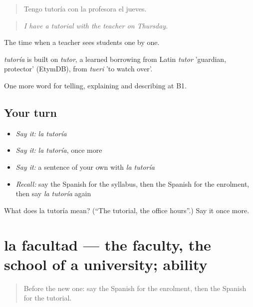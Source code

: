\begin{quote}
Tengo tutoría con la profesora el jueves.
\end{quote}

\begin{quote}
\emph{I have a tutorial with the teacher on Thursday.}
\end{quote}

The time when a teacher sees students one by one.

\begin{cousinweb}
\emph{tutoría} is built on \emph{tutor}, a learned borrowing from Latin \emph{tutor} 'guardian, protector' (EtymDB), from \emph{tueri} 'to watch over'.
\end{cousinweb}

\begin{grammarlens}[title={What you've built}]
One more word for telling, explaining and describing at B1.
\end{grammarlens}

\subsection*{Your turn}
\begin{itemize}
\raggedright
  \item \emph{Say it:} \emph{la tutoría}
  \item \emph{Say it:} \emph{la tutoría}, once more
  \item \emph{Say it:} a sentence of your own with \emph{la tutoría}
  \item \emph{Recall:} say the Spanish for the syllabus, then the Spanish for the enrolment, then say \emph{la tutoría} again
\end{itemize}

\begin{tcolorbox}[breakable,colback=teal!4,colframe=teal!35!black,title={Before you move on}]
What does la tutoría mean? (\textquotedblleft{}The tutorial, the office hours\textquotedblright{}.) Say it once more.
\end{tcolorbox}
\section[la facultad]{la facultad — the faculty, the school of a university; ability}

\label{lesson:ES-C596-facultad}



\begin{quote}
Before the new one: say the Spanish for the enrolment, then the Spanish for the tutorial.
\end{quote}

